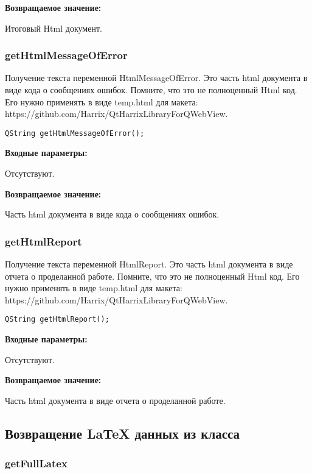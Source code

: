 \textbf{Возвращаемое значение:}

Итоговый Html документ.


\subsubsection{getHtmlMessageOfError}\label{getHtmlMessageOfError}

Получение текста переменной HtmlMessageOfError. Это часть html документа в виде кода о сообщениях ошибок. Помните, что это не полноценный Html код. Его нужно применять в виде temp.html для макета: https://github.com/Harrix/QtHarrixLibraryForQWebView.


\begin{lstlisting}[label=code_syntax_getHtmlMessageOfError,caption=Синтаксис]
QString getHtmlMessageOfError();
\end{lstlisting}

\textbf{Входные параметры:}

Отсутствуют.

\textbf{Возвращаемое значение:}

Часть html документа в виде кода о сообщениях ошибок.


\subsubsection{getHtmlReport}\label{getHtmlReport}

Получение текста переменной HtmlReport. Это часть html документа в виде отчета о проделанной работе. Помните, что это не полноценный Html код. Его нужно применять в виде temp.html для макета: https://github.com/Harrix/QtHarrixLibraryForQWebView.


\begin{lstlisting}[label=code_syntax_getHtmlReport,caption=Синтаксис]
QString getHtmlReport();
\end{lstlisting}

\textbf{Входные параметры:}

Отсутствуют.

\textbf{Возвращаемое значение:}

Часть html документа в виде отчета о проделанной работе.


\subsection{Возвращение LaTeX данных из класса}

\subsubsection{getFullLatex}\label{getFullLatex}

